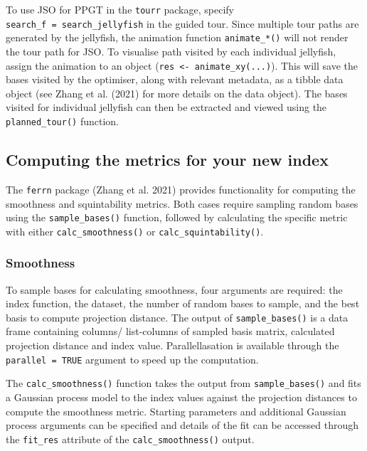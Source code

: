 \documentclass[
  12pt,
]{interact}
\theoremstyle{plain}
\begin{document}
To use JSO for PPGT in the \texttt{tourr} package, specify
\texttt{search\_f\ =\ search\_jellyfish} in the guided tour. Since
multiple tour paths are generated by the jellyfish, the animation
function \texttt{animate\_*()} will not render the tour path for JSO. To
visualise path visited by each individual jellyfish, assign the
animation to an object (\texttt{res\ \textless{}-\ animate\_xy(...)}).
This will save the bases visited by the optimiser, along with relevant
metadata, as a tibble data object (see Zhang et al. (2021) for more
details on the data object). The bases visited for individual jellyfish
can then be extracted and viewed using the \texttt{planned\_tour()}
function.

\hypertarget{computing-the-metrics-for-your-new-index}{%
\subsection{Computing the metrics for your new
index}\label{computing-the-metrics-for-your-new-index}}

The \texttt{ferrn} package (Zhang et al. 2021) provides functionality
for computing the smoothness and squintability metrics. Both cases
require sampling random bases using the \texttt{sample\_bases()}
function, followed by calculating the specific metric with either
\texttt{calc\_smoothness()} or \texttt{calc\_squintability()}.

\hypertarget{smoothness}{%
\subsubsection{Smoothness}\label{smoothness}}

To sample bases for calculating smoothness, four arguments are required:
the index function, the dataset, the number of random bases to sample,
and the best basis to compute projection distance. The output of
\texttt{sample\_bases()} is a data frame containing columns/
list-columns of sampled basis matrix, calculated projection distance and
index value. Parallellasation is available through the
\texttt{parallel\ =\ TRUE} argument to speed up the computation.

The \texttt{calc\_smoothness()} function takes the output from
\texttt{sample\_bases()} and fits a Gaussian process model to the index
values against the projection distances to compute the smoothness
metric. Starting parameters and additional Gaussian process arguments
can be specified and details of the fit can be accessed through the
\texttt{fit\_res} attribute of the \texttt{calc\_smoothness()} output.
\end{document}
